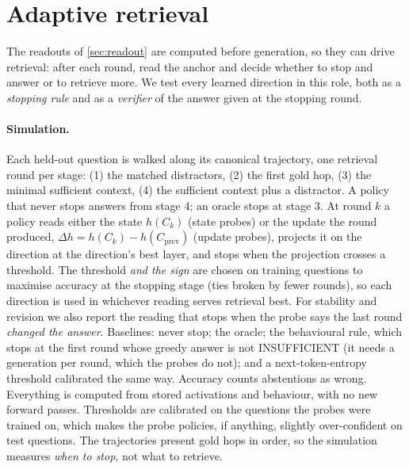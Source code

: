 \section{Adaptive retrieval}
\label{app:adaptive}
The readouts of \cref{sec:readout} are computed before generation, so they can drive retrieval: after each round, read the anchor and decide whether to stop and answer or to retrieve more. We test every learned direction in this role, both as a \emph{stopping rule} and as a \emph{verifier} of the answer given at the stopping round.

\paragraph{Simulation.} Each held-out question is walked along its canonical trajectory, one retrieval round per stage: (1) the matched distractors, (2) the first gold hop, (3) the minimal sufficient context, (4) the sufficient context plus a distractor. A policy that never stops answers from stage 4; an oracle stops at stage 3. At round $k$ a policy reads either the state $h(C_k)$ (state probes) or the update the round produced, $\Delta h=h(C_k)-h(C_{\text{prev}})$ (update probes), projects it on the direction at the direction's best layer, and stops when the projection crosses a threshold. The threshold \emph{and the sign} are chosen on training questions to maximise accuracy at the stopping stage (ties broken by fewer rounds), so each direction is used in whichever reading serves retrieval best. For stability and revision we also report the reading that stops when the probe says the last round \emph{changed the answer}. Baselines: never stop; the oracle; the behavioural rule, which stops at the first round whose greedy answer is not INSUFFICIENT (it needs a generation per round, which the probes do not); and a next-token-entropy threshold calibrated the same way. Accuracy counts abstentions as wrong. Everything is computed from stored activations and behaviour, with no new forward passes. Thresholds are calibrated on the questions the probes were trained on, which makes the probe policies, if anything, slightly over-confident on test questions. The trajectories present gold hops in order, so the simulation measures \emph{when to stop}, not what to retrieve.

\begin{table}[h]
\centering\scriptsize
\setlength{\tabcolsep}{3pt}
\resizebox{\linewidth}{!}{}
\caption{Every direction as a stopping rule: accuracy at the stopping round (mean rounds in parentheses), held-out questions of the document split. Bold: best non-oracle rule per column. $^{-}$: the training-optimal reading stops when the projection is \emph{low}. $^{+}$: the 95\% paired bootstrap interval of the accuracy difference to the behavioural rule lies above zero (1{,}000 resamples of test questions).}
\label{tab:adaptive}
\end{table}

